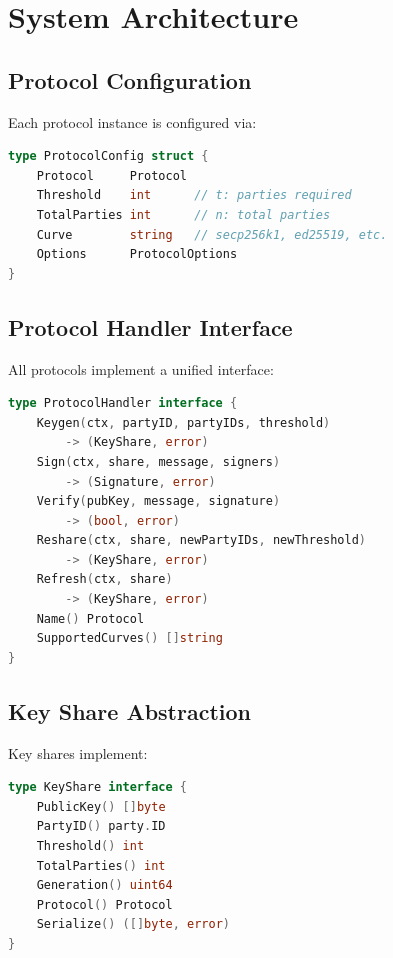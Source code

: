 \documentclass[11pt,twocolumn]{article}
\begin{document}
\section{System Architecture}

\subsection{Protocol Configuration}

Each protocol instance is configured via:

\begin{lstlisting}[language=Go,basicstyle=\ttfamily\small]
type ProtocolConfig struct {
    Protocol     Protocol
    Threshold    int      // t: parties required
    TotalParties int      // n: total parties
    Curve        string   // secp256k1, ed25519, etc.
    Options      ProtocolOptions
}
\end{lstlisting}

\subsection{Protocol Handler Interface}

All protocols implement a unified interface:

\begin{lstlisting}[language=Go,basicstyle=\ttfamily\small]
type ProtocolHandler interface {
    Keygen(ctx, partyID, partyIDs, threshold)
        -> (KeyShare, error)
    Sign(ctx, share, message, signers)
        -> (Signature, error)
    Verify(pubKey, message, signature)
        -> (bool, error)
    Reshare(ctx, share, newPartyIDs, newThreshold)
        -> (KeyShare, error)
    Refresh(ctx, share)
        -> (KeyShare, error)
    Name() Protocol
    SupportedCurves() []string
}
\end{lstlisting}

\subsection{Key Share Abstraction}

Key shares implement:

\begin{lstlisting}[language=Go,basicstyle=\ttfamily\small]
type KeyShare interface {
    PublicKey() []byte
    PartyID() party.ID
    Threshold() int
    TotalParties() int
    Generation() uint64
    Protocol() Protocol
    Serialize() ([]byte, error)
}
\end{lstlisting}
\end{document}
